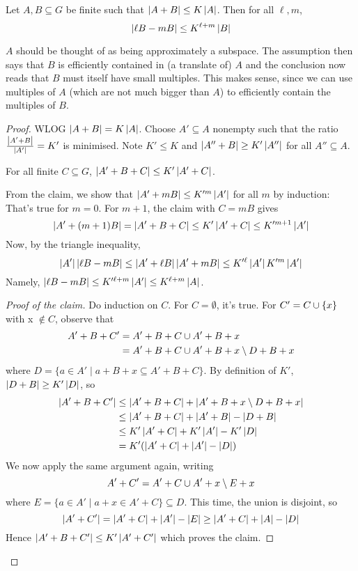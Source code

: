 \documentclass{article}
\begin{document}
\begin{nthm}
  Let $A, B \subseteq G$ be finite such that $\left\lvert A + B\right\rvert \le K\left\lvert A\right\rvert$. Then for all $\ell, m$,
  $$\left\lvert \ell B - mB\right\rvert \le K^{\ell + m}\left\lvert B\right\rvert$$
\end{nthm}
\begin{idea}
  $A$ should be thought of as being approximately a subspace. The assumption then says that $B$ is efficiently contained in (a translate of) $A$ and the conclusion now reads that $B$ must itself have small multiples. This makes sense, since we can use multiples of $A$ (which are not much bigger than $A$) to efficiently contain the multiples of $B$.
\end{idea}
\begin{proof}
  WLOG $\left\lvert A + B\right\rvert = K\left\lvert A\right\rvert$. Choose $A' \subseteq A$ nonempty such that the ratio $\frac{\left\lvert A' + B\right\rvert}{\left\lvert A'\right\rvert} = K'$ is minimised. Note $K' \le K$ and $\left\lvert A'' + B\right\rvert \ge K'\left\lvert A''\right\rvert$ for all $A'' \subseteq A$.
  \begin{claim}
    For all finite $C \subseteq G$, $\left\lvert A' + B + C\right\rvert \le K'\left\lvert A' + C\right\rvert$.
  \end{claim}
  From the claim, we show that $\left\lvert A' + mB\right\rvert \le K'^m\left\lvert A'\right\rvert$ for all $m$ by induction:
  That's true for $m = 0$. For $m + 1$, the claim with $C = mB$ gives
  $$\left\lvert A' + (m + 1)B\right\rvert = \left\lvert A' + B + C\right\rvert \le K'\left\lvert A' + C\right\rvert \le K'^{m + 1}\left\lvert A'\right\rvert$$
  Now, by the triangle inequality,
  $$\left\lvert A'\right\rvert\left\lvert \ell B - mB\right\rvert \le \left\lvert A' + \ell B\right\rvert\left\lvert A' + mB\right\rvert \le K'^\ell \left\lvert A'\right\rvert K'^m \left\lvert A'\right\rvert$$
  Namely, $\left\lvert \ell B - mB\right\rvert \le K'^{\ell + m}\left\lvert A'\right\rvert \le K^{\ell + m} \left\lvert A\right\rvert$.
  \begin{proof}[Proof of the claim]
    Do induction on $C$. For $C = \emptyset$, it's true. For $C' = C \cup \{x\}$ with x $\notin C$, observe that
    \begin{align*}
      A' + B + C'
      & = A' + B + C \cup A' + B + x \\
      & = A' + B + C \cup A' + B + x \setminus D + B + x
    \end{align*}
    where $D = \{a \in A' \mid a + B + x \subseteq A' + B + C\}$. By definition of $K'$, $\left\lvert D + B\right\rvert \ge K'\left\lvert D\right\rvert$, so
    \begin{align*}
      \left\lvert A' + B + C'\right\rvert
      & \le \left\lvert A' + B + C\right\rvert + \left\lvert A' + B + x \setminus D + B + x\right\rvert \\
      & \le \left\lvert A' + B + C\right\rvert + \left\lvert A' + B\right\rvert - \left\lvert D + B\right\rvert \\
      & \le K'\left\lvert A' + C\right\rvert + K'\left\lvert A'\right\rvert - K'\left\lvert D\right\rvert \\
      & = K'(\left\lvert A' + C\right\rvert + \left\lvert A'\right\rvert - \left\lvert D\right\rvert)
    \end{align*}
    We now apply the same argument again, writing
    $$A' + C' = A' + C \cup A' + x \setminus E + x$$
    where $E = \{a \in A' \mid a + x \in A' + C\} \subseteq D$. This time, the union is disjoint, so
    $$\left\lvert A '+ C'\right\rvert = \left\lvert A' + C\right\rvert + \left\lvert A'\right\rvert - \left\lvert E\right\rvert \ge \left\lvert A' + C\right\rvert + \left\lvert A\right\rvert - \left\lvert D\right\rvert$$
    Hence $\left\lvert A' + B + C'\right\rvert \le K'\left\lvert A' + C'\right\rvert$ which proves the claim.
  \end{proof}
\end{proof}
\end{document}
